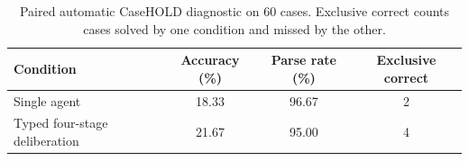 \begin{table}[t]
\caption{Paired automatic CaseHOLD diagnostic on 60 cases. Exclusive correct counts cases solved by one condition and missed by the other.}
\label{tab:multi-agent-automatic}
\centering
\begin{tabular}{lccc}
\toprule
Condition & Accuracy (\%) & Parse rate (\%) & Exclusive correct \\
\midrule
Single agent & 18.33 & 96.67 & 2 \\
Typed four-stage deliberation & 21.67 & 95.00 & 4 \\
\bottomrule
\end{tabular}
\end{table}
